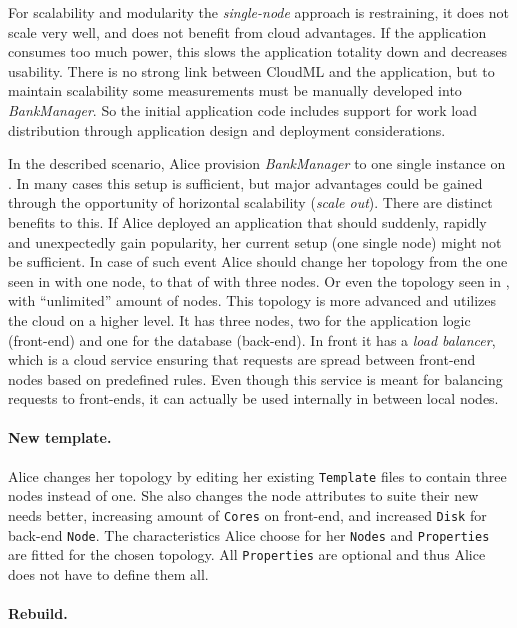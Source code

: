 For scalability and modularity the \emph{single-node} approach is restraining,
\ie it does not scale very well, and does not benefit from cloud advantages.
If the application consumes too much  power, 
this slows the application totality down and decreases usability.
There is no strong link between CloudML and the application, but to maintain
scalability some measurements must be manually developed into \emph{BankManager}.
So the initial application code includes support for work load distribution through 
application design and deployment considerations.

In the described scenario, Alice provision \emph{BankManager} to one single instance on .
In many cases this setup is sufficient, but major advantages
could be gained through the opportunity of horizontal scalability (\emph{scale out}).
There are distinct benefits to this.
If Alice deployed an application that should suddenly, 
rapidly and unexpectedly gain popularity, her current setup (one single node) might not be sufficient.
In case of such event Alice should change her topology from the one seen in 
 with one node, to that of  with three nodes.
Or even the topology seen in , with ``unlimited'' amount of nodes.
This topology is more advanced and utilizes the cloud on a higher level.
It has three nodes, two for the application logic (front-end) and one for the database (back-end).
In front it has a \emph{load balancer}, which is a cloud service ensuring that requests
are spread between front-end nodes based on predefined rules.
Even though this service is meant for balancing requests to front-ends,
it can actually be used internally in between local nodes.

\paragraph{New template.}

Alice changes her topology by editing her existing \texttt{Template} files 
to contain three nodes instead of one. 
She also changes the node attributes to suite their new needs better,
\ie increasing amount of \texttt{Cores} on front-end, and increased \texttt{Disk} for back-end \texttt{Node}.
The characteristics Alice choose for her \texttt{Nodes} and \texttt{Properties} are fitted
for the chosen topology.
All \texttt{Properties} are optional and thus Alice does not have to define them all.

\paragraph{Rebuild.}


